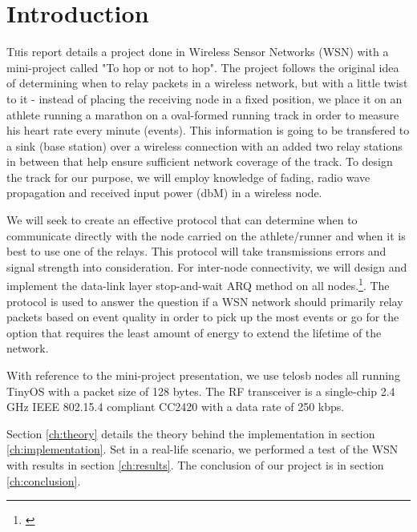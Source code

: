 \section{Introduction}\label{ch:introduction}

\lettrine[nindent=0em,lines=3]{T} his report details a project done in Wireless Sensor Networks (WSN) with a mini-project called "To hop or not to hop". The project follows the original idea of determining when to relay packets in a wireless network, but with a little twist to it - instead of placing the receiving node in a fixed position, we place it on an athlete running a marathon on a oval-formed running track in order to measure his heart rate every minute (events). This information is going to be transfered to a sink (base station) over a wireless connection with an added two relay stations in between that help ensure sufficient network coverage of the track. To design the track for our purpose, we will employ knowledge of fading, radio wave propagation and received input power (dbM) in a wireless node.

\noindent We will seek to create an effective protocol that can determine when to communicate directly with the node carried on the athlete/runner and when it is best to use one of the relays. This protocol will take transmissions errors and signal strength into consideration. For inter-node connectivity, we will design and implement the data-link layer stop-and-wait ARQ method on all nodes.\footnote{\cite{Ieee}}. The protocol is used to answer the question if a WSN network should primarily relay packets based on event quality in order to pick up the most events or go for the option that requires the least amount of energy to extend the lifetime of the network.

\noindent With reference to the mini-project presentation, we use telosb nodes all running TinyOS with a packet size of 128 bytes. The RF transceiver is a single-chip 2.4 GHz IEEE 802.15.4 compliant CC2420 with a data rate of 250 kbps.

\noindent Section \ref{ch:theory} details the theory behind the implementation in section \ref{ch:implementation}. Set in a real-life scenario, we performed a test of the WSN with results in section \ref{ch:results}. The conclusion of our project is in section \ref{ch:conclusion}.

